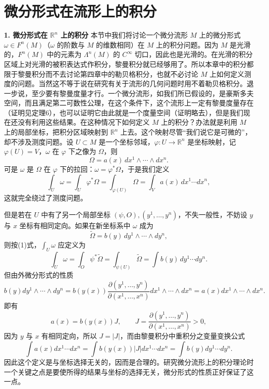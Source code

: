 \section{微分形式在流形上的积分}

\noindent\textbf{1. 微分形式在 $\mathbb R^n$ 上的积分}\quad
本节中我们将讨论一个微分流形 $M$ 上的微分形式 $\omega\in F^n(M)$（$\omega$ 的阶数与 $M$ 的维数相同）在 $M$ 上的积分问题。因为 $M$ 是光滑的，$F^n(M)$ 中的元素为 $\Lambda^n(M)$ 的 $C^\infty$ 切口，因此也是光滑的。在光滑的积分区域上对光滑的被积表达式作积分，黎曼积分就已经够用了。所以本章中的积分都限于黎曼积分而不去讨论第四章中的勒贝格积分，也就不必讨论 $M$ 上如何定义测度的问题。当然这不等于说在研究有关于流形的几何问题时用不着勒贝格积分。退一步说，至少要有黎曼度量才行。一个微分流形，如我们所已假设的，是豪斯多夫空间，而且满足第二可数性公理，在这个条件下，这个流形上一定有黎曼度量存在（证明见定理6），也可以证明它由此就是一个度量空间（证明略去），但是我们现在还没有利用这些结果。在这种情况下如何定义 $M$ 上的积分？办法就是利用 $M$ 上的局部坐标，把积分区域映射到 $\mathbb R^n$ 上去。这个映射尽管“我们说它是可微的”，却不涉及测度问题。设 $U\subset M$ 是一个坐标邻域，$\varphi:U\to\mathbb R^n$ 是坐标映射，记 $\varphi(U)=V$，$\omega$ 在 $\varphi$ 下之像为 $\Omega$，则
\[
 \Omega=a(x)\,dx^1\wedge\cdots\wedge dx^n.
\]
可是 $\omega$ 是 $\Omega$ 在 $\varphi$ 下的拉回：$\omega=\varphi^*\Omega$，于是我们定义
\begin{equation}
 \int_U\omega=\int_U\varphi^*\Omega=\int_{\varphi(U)}\Omega
 =\int_V a(x)\,dx^1\cdots dx^n,
 \tag{1}
\end{equation}
这就完全绕过了测度问题。

但是若在 $U$ 中有了另一个局部坐标 $(\psi,O),(y^1,\ldots,y^n)$，不失一般性，不妨设 $y$ 与 $x$ 坐标有相同定向。如果在新坐标系中 $\omega$ 成为
\[
 \widetilde\Omega=b(y)\,dy^1\wedge\cdots\wedge dy^n,
\]
则按(1)式，$\int_U\omega$ 应定义为
\begin{equation}
 \int_U\omega=\int_O\psi^*\widetilde\Omega
 =\int_{\psi(U)}\widetilde\Omega
 =\int b(y)\,dy^1\cdots dy^n.
 \tag{2}
\end{equation}
但由外微分形式的性质
\[
 b(y)dy^1\wedge\cdots\wedge dy^n
 =b(y(x))\frac{\partial(y^1,\ldots,y^n)}{\partial(x^1,\ldots,x^n)}
 dx^1\wedge\cdots\wedge dx^n
 =a(x)dx^1\wedge\cdots\wedge dx^n.
\]
即有
\[
 a(x)=b(y(x))J,
 \qquad
 J=\frac{\partial(y^1,\ldots,y^n)}{\partial(x^1,\ldots,x^n)}>0,
\]
因为 $y$ 与 $x$ 有相同定向，所以 $J=|J|$，而由黎曼积分中重积分之变量变换公式
\[
 \int a(x)dx^1\cdots dx^n
 =\int b(y(x))|J|dx^1\cdots dx^n
 =\int b(y)dy^1\cdots dy^n.
\]
因此这个定义是与坐标选择无关的，因而是合理的。研究微分流形上的积分理论时一个关键之点是要使所得的结果与坐标的选择无关，微分形式的性质正好保证了这一点。

